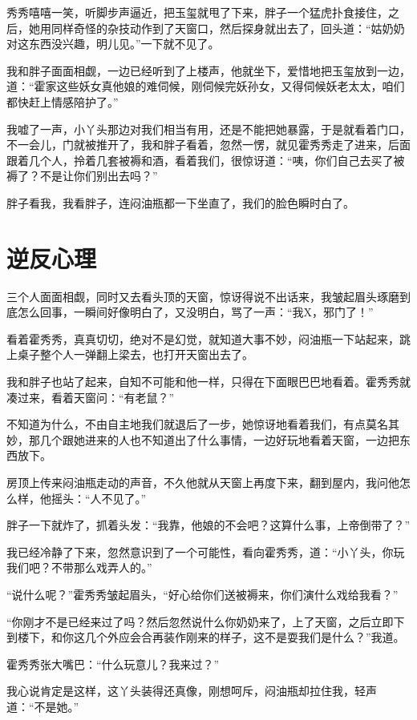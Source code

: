 秀秀嘻嘻一笑，听脚步声逼近，把玉玺就甩了下来，胖子一个猛虎扑食接住，之后，她用同样奇怪的杂技动作到了天窗口，然后探身就出去了，回头道：“姑奶奶对这东西没兴趣，明儿见。”一下就不见了。

我和胖子面面相觑，一边已经听到了上楼声，他就坐下，爱惜地把玉玺放到一边，道：“霍家这些妖女真他娘的难伺候，刚伺候完妖孙女，又得伺候妖老太太，咱们都快赶上情感陪护了。”

我嘘了一声，小丫头那边对我们相当有用，还是不能把她暴露，于是就看着门口，不一会儿，门就被推开了，我和胖子看着，忽然一愣，就见霍秀秀走了进来，后面跟着几个人，拎着几套被褥和酒，看着我们，很惊讶道：“咦，你们自己去买了被褥了？不是让你们别出去吗？”

胖子看我，我看胖子，连闷油瓶都一下坐直了，我们的脸色瞬时白了。

\chapter{逆反心理}

三个人面面相觑，同时又去看头顶的天窗，惊讶得说不出话来，我皱起眉头琢磨到底怎么回事，一瞬间好像明白了，又没明白，骂了一声：“我X，邪门了！”

看着霍秀秀，真真切切，绝对不是幻觉，就知道大事不妙，闷油瓶一下站起来，跳上桌子整个人一弹翻上梁去，也打开天窗出去了。

我和胖子也站了起来，自知不可能和他一样，只得在下面眼巴巴地看着。霍秀秀就凑过来，看着天窗问：“有老鼠？”

不知道为什么，不由自主地我们就退后了一步，她惊讶地看着我们，有点莫名其妙，那几个跟她进来的人也不知道出了什么事情，一边好玩地看着天窗，一边把东西放下。

房顶上传来闷油瓶走动的声音，不久他就从天窗上再度下来，翻到屋内，我问他怎么样，他摇头：“人不见了。”

胖子一下就炸了，抓着头发：“我靠，他娘的不会吧？这算什么事，上帝倒带了？”

我已经冷静了下来，忽然意识到了一个可能性，看向霍秀秀，道：“小丫头，你玩我们吧？不带那么戏弄人的。”

“说什么呢？”霍秀秀皱起眉头，“好心给你们送被褥来，你们演什么戏给我看？”

“你刚才不是已经来过了吗？然后忽然说什么你奶奶来了，上了天窗，之后立即下到楼下，和你这几个外应会合再装作刚来的样子，这不是耍我们是什么？”我道。

霍秀秀张大嘴巴：“什么玩意儿？我来过？”

我心说肯定是这样，这丫头装得还真像，刚想呵斥，闷油瓶却拉住我，轻声道：“不是她。”

